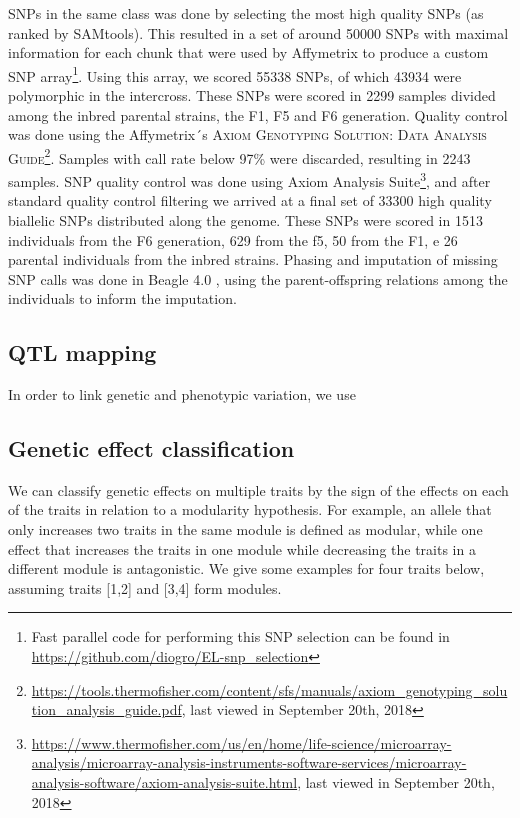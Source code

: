 \begin{refsection}
SNPs in the same class was done by selecting the most high quality SNPs (as ranked by SAMtools). This resulted in a set of around 50000 SNPs with maximal information for each chunk that were used by Affymetrix to produce a custom SNP array\footnote{Fast parallel code for performing this SNP selection can be found in \url{https://github.com/diogro/EL-snp_selection}}. Using this array, we scored 55338 SNPs, of which 43934 were polymorphic in the intercross. These SNPs were scored in 2299 samples divided among the inbred parental strains, the F1, F5 and F6 generation. Quality control was done using the Affymetrix´s \textsc{Axiom Genotyping Solution: Data Analysis Guide}\footnote{\url{https://tools.thermofisher.com/content/sfs/manuals/axiom_genotyping_solution_analysis_guide.pdf}, last viewed in September 20th, 2018}. Samples with call rate below 97\% were discarded, resulting in 2243 samples. SNP quality control was done using Axiom Analysis Suite\footnote{\url{https://www.thermofisher.com/us/en/home/life-science/microarray-analysis/microarray-analysis-instruments-software-services/microarray-analysis-software/axiom-analysis-suite.html}, last viewed in September 20th, 2018}, and after standard quality control filtering we arrived at a final set of 33300 high quality biallelic SNPs distributed along the genome. These SNPs were scored in 1513 individuals from the F6 generation, 629 from the f5, 50 from the F1, e 26 parental individuals from the inbred strains. Phasing and imputation of missing SNP calls was done in Beagle 4.0 \parencite{Browning2007-el}, using the parent-offspring relations among the individuals to inform the imputation.

\subsection{QTL mapping}

In order to link genetic and phenotypic variation, we use 

\subsection{Genetic effect classification}


We can classify genetic effects on multiple traits by the sign of the effects on each of the traits in relation to a modularity hypothesis. For example, an allele that only increases two traits in the same module is defined as modular, while one effect that increases the traits in one module while decreasing the traits in a different module is antagonistic. We give some examples for four traits below, assuming traits [1,2] and [3,4] form modules.


\end{refsection}
